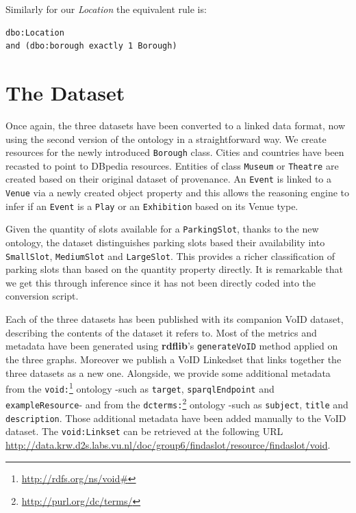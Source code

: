 \documentclass[runningheads,a4paper]{../../StyleFiles/llncs}
\begin{document}
Similarly for our \textit{Location} the equivalent rule is: 

\begin{lstlisting}[captionpos=b, title=Class equivalent to Location with the use of our subproperty borough, label=lst:owl, basicstyle=\ttfamily\small,frame=bt]
dbo:Location 
and (dbo:borough exactly 1 Borough)
\end{lstlisting}

\section{The Dataset}
Once again, the three datasets have been converted to a linked data format, now using the second version of the ontology in a straightforward way. We create resources for the newly introduced \texttt{Borough} class. Cities and countries have been recasted to point to DBpedia resources. Entities of class \texttt{Museum} or \texttt{Theatre} are created based on their original dataset of provenance. An \texttt{Event} is linked to a \texttt{Venue} via a newly created object property and this allows the reasoning engine to infer if an \texttt{Event} is a \texttt{Play} or an \texttt{Exhibition} based on its Venue type.

Given the quantity of slots available for a \texttt{ParkingSlot}, thanks to the new ontology, the dataset distinguishes parking slots based their availability into \texttt{SmallSlot}, \texttt{MediumSlot} and \texttt{LargeSlot}. This provides a richer classification of parking slots than based on the quantity
property directly. It is remarkable that we get this through inference since it has not been directly coded into the conversion script.

Each of the three datasets has been published with its companion VoID dataset, describing the contents of the dataset it refers to. Most of the metrics and metadata have been generated using \textbf{rdflib}'s \texttt{generateVoID} method applied on the three graphs. Moreover we publish a VoID Linkedset that links together the three datasets as a new one. Alongside, we provide some additional metadata from the \texttt{void:}\footnote{\url{http://rdfs.org/ns/void#}} ontology -such as \texttt{target}, \texttt{sparqlEndpoint} and \texttt{exampleResource}- and from the \texttt{dcterms:}\footnote{\url{http://purl.org/dc/terms/}} ontology -such as \texttt{subject}, \texttt{title} and \texttt{description}. Those additional metadata have been added manually to the VoID dataset. The \texttt{void:Linkset} can be retrieved at the following URL \url{http://data.krw.d2s.labs.vu.nl/doc/group6/findaslot/resource/findaslot/void}.
\end{document}
